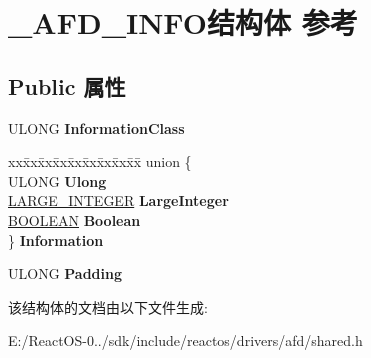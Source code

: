 \hypertarget{struct___a_f_d___i_n_f_o}{}\section{\+\_\+\+A\+F\+D\+\_\+\+I\+N\+F\+O结构体 参考}
\label{struct___a_f_d___i_n_f_o}
\subsection*{Public 属性}
\begin{DoxyCompactItemize}
\item 
\mbox{\label{struct___a_f_d___i_n_f_o_a7cb6c124efe1c324a1a140e70aa4f637}} 
U\+L\+O\+NG {\bfseries Information\+Class}
\item 
\mbox{\label{struct___a_f_d___i_n_f_o_a623df366b9494fbbd005a220c47783b9}} 
\begin{tabbing}
xx\=xx\=xx\=xx\=xx\=xx\=xx\=xx\=xx\=\kill
union \{\\
\>ULONG {\bfseries Ulong}\\
\>\hyperlink{union___l_a_r_g_e___i_n_t_e_g_e_r}{LARGE\_INTEGER} {\bfseries LargeInteger}\\
\>\hyperlink{_processor_bind_8h_a112e3146cb38b6ee95e64d85842e380a}{BOOLEAN} {\bfseries Boolean}\\
\} {\bfseries Information}\\

\end{tabbing}\item 
\mbox{\label{struct___a_f_d___i_n_f_o_a96eccdf748ec85c1d0635d1c8844c697}} 
U\+L\+O\+NG {\bfseries Padding}
\end{DoxyCompactItemize}


该结构体的文档由以下文件生成\+:\begin{DoxyCompactItemize}
\item 
E\+:/\+React\+O\+S-\/0../sdk/include/reactos/drivers/afd/shared.\+h\end{DoxyCompactItemize}
